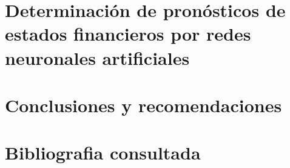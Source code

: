 \documentclass[
  12pt,
]{article}
\begin{document}
\newpage

\hypertarget{determinaciuxf3n-de-pronuxf3sticos-de-estados-financieros-por-redes-neuronales-artificiales}{%
\section{Determinación de pronósticos de estados financieros por redes
neuronales
artificiales}\label{determinaciuxf3n-de-pronuxf3sticos-de-estados-financieros-por-redes-neuronales-artificiales}}

\newpage

\hypertarget{conclusiones-y-recomendaciones}{%
\section{Conclusiones y
recomendaciones}\label{conclusiones-y-recomendaciones}}

\newpage

\hypertarget{bibliografia-consultada}{%
\section{Bibliografia consultada}\label{bibliografia-consultada}}
\end{document}
